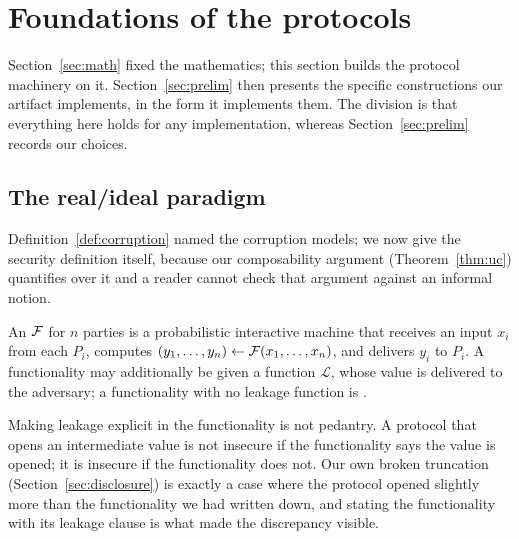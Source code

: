\section{Foundations of the protocols}
\label{sec:found}

Section~\ref{sec:math} fixed the mathematics; this section builds the protocol
machinery on it. Section~\ref{sec:prelim} then presents the specific
constructions our artifact implements, in the form it implements them. The
division is that everything here holds for any implementation, whereas
Section~\ref{sec:prelim} records our choices.

\subsection{The real/ideal paradigm}
\label{sec:found:sim}

Definition~\ref{def:corruption} named the corruption models; we now give the
security definition itself, because our composability argument
(Theorem~\ref{thm:uc}) quantifies over it and a reader cannot check that argument
against an informal notion.

\begin{definition}
\label{def:functionality}
An  $\mathcal{F}$ for $n$ parties is a probabilistic
interactive machine that receives an input $x_i$ from each $P_i$, computes
$(y_1,\dots,y_n) \gets \mathcal{F}(x_1,\dots,x_n)$, and delivers $y_i$ to $P_i$. A
functionality may additionally be given a  function $\mathcal{L}$,
whose value is delivered to the adversary; a functionality with no leakage
function is .
\end{definition}

Making leakage explicit in the functionality is not pedantry. A protocol that
opens an intermediate value is not insecure if the functionality says the value is
opened; it is insecure if the functionality does not. Our own broken truncation
(Section~\ref{sec:disclosure}) is exactly a case where the protocol opened
slightly more than the functionality we had written down, and stating the
functionality with its leakage clause is what made the discrepancy visible.


